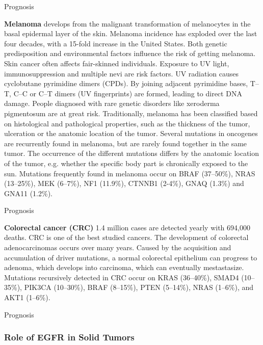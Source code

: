       Prognosis

      \textbf{Melanoma} develops from the malignant transformation of melanocytes
      in the basal epidermal layer of the skin. Melanoma incidence has exploded
      over the last four decades, with a 15-fold increase in the United States.
      Both genetic predisposition and environmental factors influence the risk
      of getting melanoma. Skin cancer often affects fair-skinned individuals.
      Exposure to UV light, immunosuppression and multiple nevi are risk factors.
      UV radiation causes cyclobutane pyrimidine dimers (CPDs). By joining
      adjacent pyrimidine bases, T--T, C--C or C--T dimers (UV
      fingerprints) are formed, leading to direct DNA damage. People diagnosed
      with rare genetic disorders like xeroderma pigmentosum are at great risk.
      Traditionally, melanoma has been classified based on histological and
      pathological properties, such as the thickness of the tumor, ulceration
      or the anatomic location of the tumor. Several mutations in oncogenes
      are recurrently found in melanoma, but are rarely found together in the
      same tumor. The occurrence of the different mutations differs by the
      anatomic location of the tumor, e.g. whether the specific body part is
      chronically exposed to the sun. Mutations frequently found in melanoma
      occur on BRAF (37--50\%), NRAS (13--25\%), MEK (6--7\%), NF1 (11.9\%),
      CTNNB1 (2-4\%), GNAQ (1.3\%) and GNA11 (1.2\%).

      Prognosis

      \textbf{Colorectal cancer (CRC)} 1.4 million cases are detected yearly
      with 694,000 deaths. CRC is one of the best studied cancers. The
      development of colorectal adenocarcinomas occurs over many years. Caused
      by the acquisition and accumulation of driver mutations, a normal
      colorectal epithelium can progress to adenoma, which develops into
      carcinoma, which can eventually mestastasize. Mutations recursively
      detected in CRC occur on KRAS (36--40\%), SMAD4 (10--35\%), PIK3CA
      (10--30\%), BRAF (8--15\%), PTEN (5--14\%), NRAS (1--6\%), and  AKT1
      (1--6\%).

      Prognosis

    \subsubsection{Role of EGFR in Solid Tumors}

